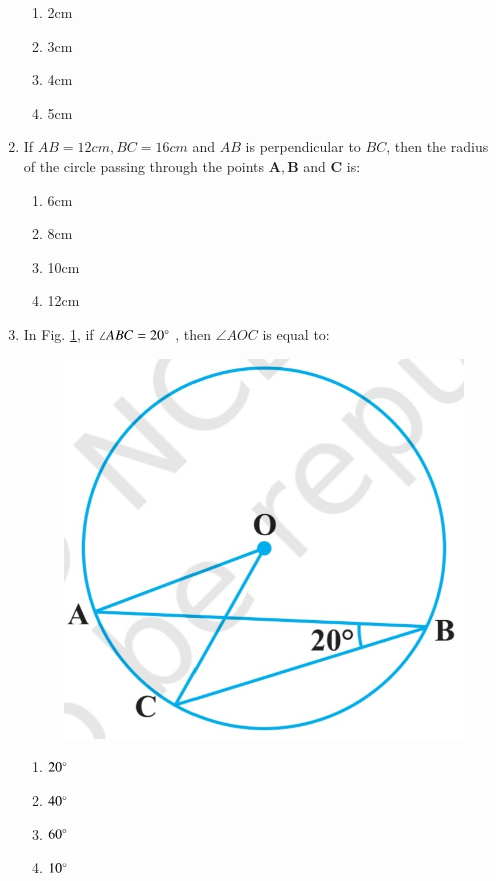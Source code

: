 \documentclass{article}
\let\vec\mathbf{}
\begin{document}
\begin{enumerate}
\begin{enumerate}
\item 2cm
\item 3cm
\item 4cm
\item 5cm
\end{enumerate}
\item If $AB = 12 cm, BC = 16 cm$ and $AB$ is perpendicular to $BC$, then the radius of the circle passing through the points $\vec{A},\vec{B}$ and $\vec{C}$ is:
\begin{enumerate}
\item 6cm
\item 8cm
\item 10cm
\item 12cm
\end{enumerate}
\item In Fig. \ref{fig:10.4}, if $\angle ABC = 20\degree$ , then $\angle AOC$ is equal to: 
\begin{figure}[H]
\centering
\includegraphics[width=\columnwidth]{figs/10.4.jpg}
\caption{}
\label{fig:10.4}
\end{figure}
\begin{enumerate}
\item $20\degree$
\item $40\degree$
\item $60\degree$
\item $10\degree$

\end{enumerate}
\end{enumerate}
\end{document}

